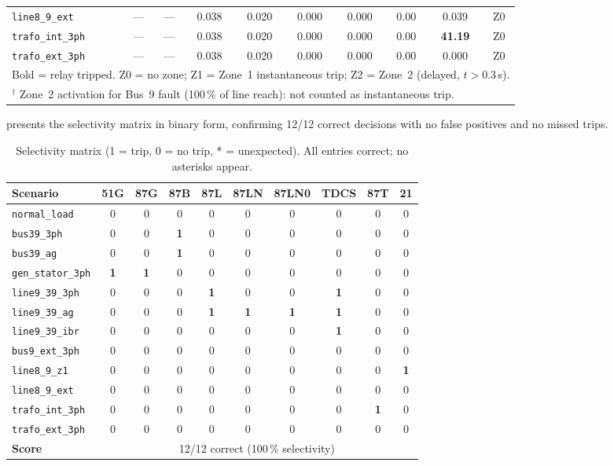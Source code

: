 \documentclass[12pt,a4paper]{article}
\begin{document}
\begin{table}[H]
\begin{tabular}{lccccccccc}
\texttt{line8\_9\_ext}   & ---   & ---    & 0.038  & 0.020 & 0.000 & 0.000 & 0.00  & 0.039  & Z0 \\
\texttt{trafo\_int\_3ph} & ---   & ---    & 0.038  & 0.020 & 0.000 & 0.000 & 0.00  & \textbf{41.19} & Z0 \\
\texttt{trafo\_ext\_3ph} & ---   & ---    & 0.038  & 0.020 & 0.000 & 0.000 & 0.00  & 0.000  & Z0 \\
\bottomrule
\multicolumn{10}{l}{\scriptsize
  Bold = relay tripped.
  Z0 = no zone; Z1 = Zone~1 instantaneous trip; Z2 = Zone~2 (delayed, $t > 0.3$\,s).}\\
\multicolumn{10}{l}{\scriptsize
  $^\dagger$ Zone~2 activation for Bus~9 fault (100\,\% of line reach): not counted as instantaneous trip.}
\end{tabular}
\end{table}

 presents the selectivity matrix in binary form,
confirming 12/12 correct decisions with no false positives and no missed
trips.

\begin{table}[H]
\centering
\caption{Selectivity matrix (1 = trip, 0 = no trip, * = unexpected).
  All entries correct; no asterisks appear.}
\label{tab:selectivity}
\setlength{\tabcolsep}{4pt}
\small
\begin{tabular}{lccccccccc}
\toprule
Scenario & 51G & 87G & 87B & 87L & 87LN & 87LN0 & TDCS & 87T & 21 \\
\midrule
\texttt{normal\_load}    & 0 & 0 & 0 & 0 & 0 & 0 & 0 & 0 & 0 \\
\texttt{bus39\_3ph}      & 0 & 0 & \textbf{1} & 0 & 0 & 0 & 0 & 0 & 0 \\
\texttt{bus39\_ag}       & 0 & 0 & \textbf{1} & 0 & 0 & 0 & 0 & 0 & 0 \\
\texttt{gen\_stator\_3ph}& \textbf{1} & \textbf{1} & 0 & 0 & 0 & 0 & 0 & 0 & 0 \\
\texttt{line9\_39\_3ph}  & 0 & 0 & 0 & \textbf{1} & 0 & 0 & \textbf{1} & 0 & 0 \\
\texttt{line9\_39\_ag}   & 0 & 0 & 0 & \textbf{1} & \textbf{1} & \textbf{1} & \textbf{1} & 0 & 0 \\
\texttt{line9\_39\_ibr}  & 0 & 0 & 0 & 0 & 0 & 0 & \textbf{1} & 0 & 0 \\
\texttt{bus9\_ext\_3ph}  & 0 & 0 & 0 & 0 & 0 & 0 & 0 & 0 & 0 \\
\texttt{line8\_9\_z1}    & 0 & 0 & 0 & 0 & 0 & 0 & 0 & 0 & \textbf{1} \\
\texttt{line8\_9\_ext}   & 0 & 0 & 0 & 0 & 0 & 0 & 0 & 0 & 0 \\
\texttt{trafo\_int\_3ph} & 0 & 0 & 0 & 0 & 0 & 0 & 0 & \textbf{1} & 0 \\
\texttt{trafo\_ext\_3ph} & 0 & 0 & 0 & 0 & 0 & 0 & 0 & 0 & 0 \\
\midrule
\textbf{Score} & \multicolumn{9}{c}{12/12 correct (100\,\% selectivity)} \\
\bottomrule
\end{tabular}
\end{table}
\end{document}
